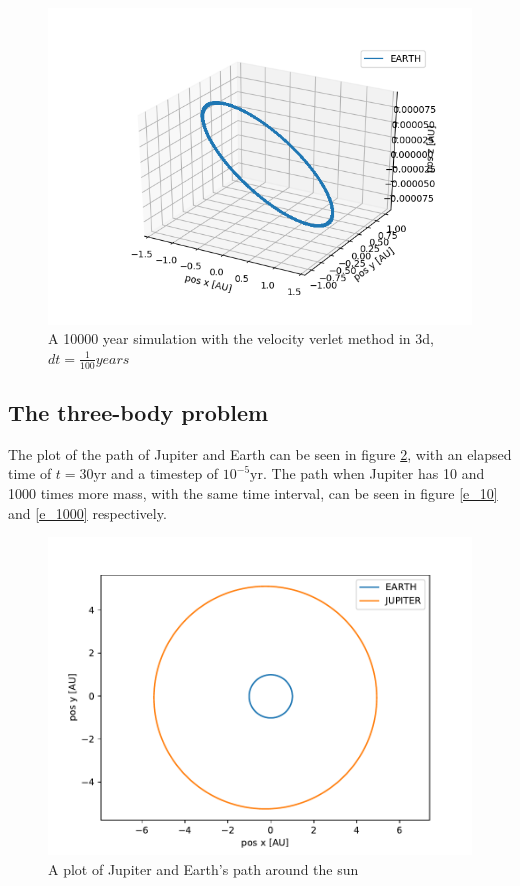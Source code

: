 \documentclass[a4paper]{article}
\begin{document}
	\begin{figure}[h!]
		\centering 
		\includegraphics[scale=0.7]{vv1e4_3d.png}
		\caption{A 10000 year simulation with the velocity verlet method in 3d, $dt = \frac{1}{100}years$}
		\label{vv3d}
	\end{figure}
	
	
	\subsection{The three-body problem}
	The plot of the path of Jupiter and Earth can be seen in figure \ref{e_1}, with an elapsed time of $t=30\text{yr}$ and a timestep of $10^{-5} \text{yr}$. The path when Jupiter has 10 and 1000 times more mass, with the same time interval, can be seen in figure \ref{e_10} and \ref{e_1000} respectively. 
	
	\begin{figure}[h!]
		\centering 
		\includegraphics[scale=0.7]{../opp_e1.pdf}
		\caption{A plot of Jupiter and Earth's path around the sun}
		\label{e_1}
	\end{figure}
	
\end{document}
